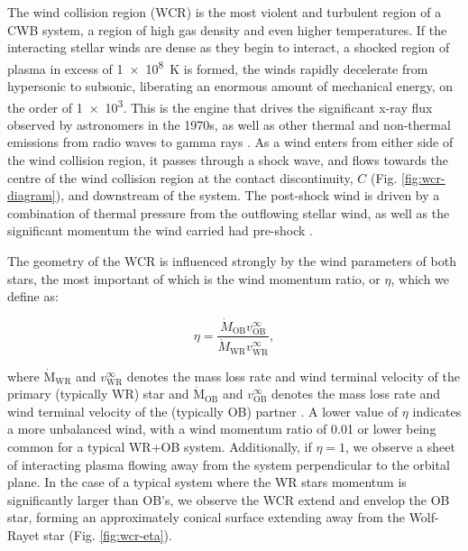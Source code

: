 \noindent
The wind collision region (WCR) is the most violent and turbulent region of a CWB system, a region of high gas density and even higher temperatures.
If the interacting stellar winds are dense as they begin to interact, a shocked region of plasma in excess of \SI{1e8}{\kelvin} is formed, the winds rapidly decelerate from hypersonic to subsonic, liberating an enormous amount of mechanical energy, on the order of \SI{1e3}{\solarluminosity}.
This is the engine that drives the significant x-ray flux observed by astronomers in the 1970s, as well as other thermal and non-thermal emissions from radio waves to gamma rays
\parencite{eichler_particle_1993,grimaldoProtonAccelerationColliding2019}.
As a wind enters from either side of the wind collision region, it passes through a shock wave, and flows towards the centre of the wind collision region at the contact discontinuity, $C$ (Fig. \ref{fig:wcr-diagram}), and downstream of the system.
The post-shock wind is driven by a combination of thermal pressure from the outflowing stellar wind, as well as the significant momentum the wind carried had pre-shock \parencite{stevens_colliding_1992}.

The geometry of the WCR is influenced strongly by the wind parameters of both stars, the most important of which is the wind momentum ratio, or $\eta$, which we define as:

\begin{equation}
  \label{eq:etach2}
  \eta = \frac{\dot M_\text{OB} v^\infty_\text{OB}}{\dot M_\text{WR} v^\infty_\text{WR}},
\end{equation}

\noindent
where $\dot{\text{M}}_\text{WR}$ and $v^{\infty}_\text{WR}$ denotes the mass loss rate and wind terminal velocity of the primary (typically WR) star and $\dot{\text{M}}_\text{OB}$ and $v^{\infty}_\text{OB}$ denotes the mass loss rate and wind terminal velocity of the (typically OB) partner \parencite{usov_stellar_1991}.
A lower value of $\eta$ indicates a more unbalanced wind, with a wind momentum ratio of \num{0.01} or lower being common for a typical WR+OB system.
Additionally, if $\eta = 1$, we observe a sheet of interacting plasma flowing away from the system perpendicular to the orbital plane.
In the case of a typical system where the WR stars momentum is significantly larger than OB's, we observe the WCR extend and envelop the OB star, forming an approximately conical surface extending away from the Wolf-Rayet star (Fig. \ref{fig:wcr-eta}).


